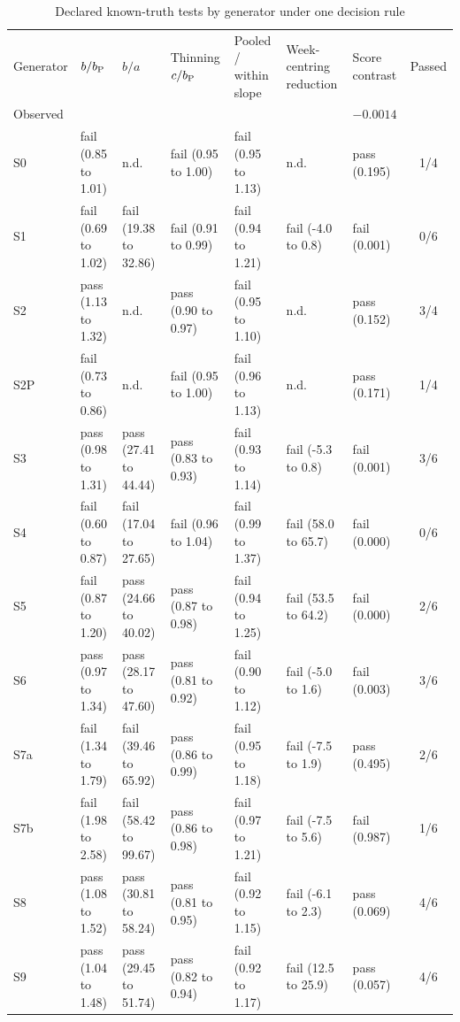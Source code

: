 \begin{table}[!tbp]
\centering
\scriptsize
\setlength{\tabcolsep}{3pt}
\caption{Declared known-truth tests by generator under one decision rule}
\label{tab:ma_tests}
\begin{tabularx}{\linewidth}{@{}l*{6}{>{\centering\arraybackslash}X}c@{}}
\toprule
Generator & $b/b_{\mathrm P}$ & $b/a$ & Thinning $c/b_{\mathrm P}$ & Pooled / within slope & Week-centring reduction & Score contrast & Passed \\
Observed & 1.26 & 37.4 & 0.91 & 1.48 & 34.7 & $-0.0014$ &  \\
\midrule
S0 & fail (0.85 to 1.01) & n.d. & fail (0.95 to 1.00) & fail (0.95 to 1.13) & n.d. & pass (0.195) & 1/4 \\
S1 & fail (0.69 to 1.02) & fail (19.38 to 32.86) & fail (0.91 to 0.99) & fail (0.94 to 1.21) & fail (-4.0 to 0.8) & fail (0.001) & 0/6 \\
S2 & pass (1.13 to 1.32) & n.d. & pass (0.90 to 0.97) & fail (0.95 to 1.10) & n.d. & pass (0.152) & 3/4 \\
S2P & fail (0.73 to 0.86) & n.d. & fail (0.95 to 1.00) & fail (0.96 to 1.13) & n.d. & pass (0.171) & 1/4 \\
S3 & pass (0.98 to 1.31) & pass (27.41 to 44.44) & pass (0.83 to 0.93) & fail (0.93 to 1.14) & fail (-5.3 to 0.8) & fail (0.001) & 3/6 \\
S4 & fail (0.60 to 0.87) & fail (17.04 to 27.65) & fail (0.96 to 1.04) & fail (0.99 to 1.37) & fail (58.0 to 65.7) & fail (0.000) & 0/6 \\
S5 & fail (0.87 to 1.20) & pass (24.66 to 40.02) & pass (0.87 to 0.98) & fail (0.94 to 1.25) & fail (53.5 to 64.2) & fail (0.000) & 2/6 \\
S6 & pass (0.97 to 1.34) & pass (28.17 to 47.60) & pass (0.81 to 0.92) & fail (0.90 to 1.12) & fail (-5.0 to 1.6) & fail (0.003) & 3/6 \\
S7a & fail (1.34 to 1.79) & fail (39.46 to 65.92) & pass (0.86 to 0.99) & fail (0.95 to 1.18) & fail (-7.5 to 1.9) & pass (0.495) & 2/6 \\
S7b & fail (1.98 to 2.58) & fail (58.42 to 99.67) & pass (0.86 to 0.98) & fail (0.97 to 1.21) & fail (-7.5 to 5.6) & fail (0.987) & 1/6 \\
S8 & pass (1.08 to 1.52) & pass (30.81 to 58.24) & pass (0.81 to 0.95) & fail (0.92 to 1.15) & fail (-6.1 to 2.3) & pass (0.069) & 4/6 \\
S9 & pass (1.04 to 1.48) & pass (29.45 to 51.74) & pass (0.82 to 0.94) & fail (0.92 to 1.17) & fail (12.5 to 25.9) & pass (0.057) & 4/6 \\

\end{tabularx}
\end{table}
